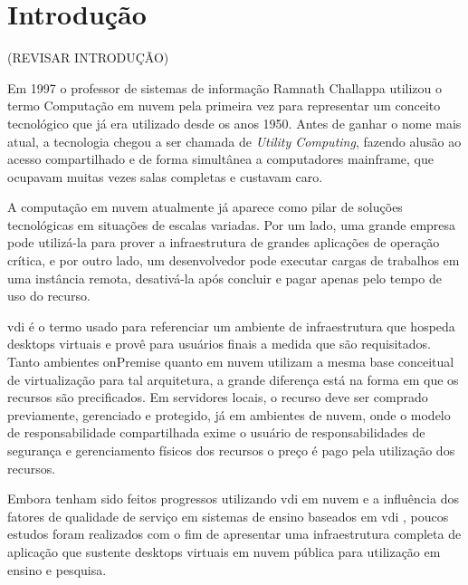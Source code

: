 
\chapter{Introdução}\label{cap:introducao}

(REVISAR INTRODUÇÃO)

Em 1997 o professor de sistemas de informação Ramnath Challappa utilizou o termo Computação em nuvem
pela primeira vez para representar um conceito tecnológico que já era utilizado desde os anos 1950.
Antes de ganhar o nome mais atual, a tecnologia chegou a ser chamada de \textit{Utility Computing},
fazendo alusão ao acesso compartilhado e de forma simultânea a computadores mainframe, que ocupavam
muitas vezes salas completas e custavam caro. \citep{dellcloud}

A computação em nuvem atualmente já aparece como pilar de soluções tecnológicas em situações de
escalas variadas. Por um lado, uma grande empresa pode utilizá-la para prover a infraestrutura de
grandes aplicações de operação crítica, e por outro lado, um desenvolvedor pode executar cargas de
trabalhos em uma instância remota, desativá-la após concluir e pagar apenas pelo tempo de uso do
recurso. \citep{taurioncloud}

\gls{vdi} é o termo usado para referenciar um ambiente de infraestrutura que hospeda \glspl{desktop}
virtuais e provê para usuários finais a medida que são requisitados. Tanto ambientes \gls{onPremise}
quanto em nuvem utilizam a mesma base conceitual de virtualização para tal arquitetura, a grande
diferença está na forma em que os recursos são precificados. Em servidores locais, o recurso deve
ser comprado previamente, gerenciado e protegido, já em ambientes de nuvem, onde o modelo de
responsabilidade compartilhada exime o usuário de responsabilidades de segurança e gerenciamento
físicos dos recursos o preço é pago pela utilização dos recursos. \citep{vmwarevdi}

Embora tenham sido feitos progressos utilizando \gls{vdi} em nuvem e a influência dos fatores de
qualidade de serviço em sistemas de ensino baseados em \gls{vdi} \citep{qoselearning}, poucos
estudos foram realizados com o fim de apresentar uma infraestrutura completa de aplicação que
sustente \glspl{desktop} virtuais em nuvem pública para utilização em ensino e pesquisa.

